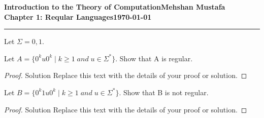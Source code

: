 \documentclass[11pt]{article}
\newcommand{\myname}{Mehshan Mustafa}
\newcommand{\dated}{\today}
\newenvironment{problem}[2][Problem]{\begin{trivlist}
\item[\hskip \labelsep {\bfseries #1}\hskip \labelsep {\bfseries #2.}]}{\end{trivlist}}
\begin{document}
\textbf{Introduction to the Theory of
Computation}\hfill\textbf{\myname}\\[0.01in]
\textbf{Chapter 1: Reqular Languages}\hfill\textbf{\dated}\\
\smallskip\hrule\bigskip

\begin{problem}{1.72}
Let $\Sigma = {0, 1}$.
\end{problem}

\begin{problem}[Part]{a}
Let $A = \{0^{k}u0^{k} \; | \; k \geq 1 \; and \; u \in \Sigma^{*}\}$. Show that A is regular.
\end{problem}

\begin{proof}
Solution Replace this text with the details of your proof or solution.
\end{proof}

\begin{problem}[Part]{b}
Let $B = \{0^{k}1u0^{k} \; | \; k \geq 1 \; and \; u \in \Sigma^{*}\}$. Show that B is not regular.
\end{problem}

\begin{proof}
Solution Replace this text with the details of your proof or solution.
\end{proof}
\end{document}
